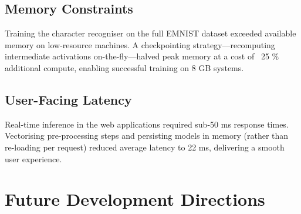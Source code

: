 \documentclass[11pt,a4paper]{report}
\begin{document}
\subsection*{Memory Constraints}

Training the character recogniser on the full EMNIST dataset exceeded available memory on low-resource machines. A checkpointing strategy—recomputing intermediate activations on-the-fly—halved peak memory at a cost of ~25 \% additional compute, enabling successful training on 8 GB systems.

\subsection*{User-Facing Latency}

Real-time inference in the web applications required sub-50 ms response times. Vectorising pre-processing steps and persisting models in memory (rather than re-loading per request) reduced average latency to 22 ms, delivering a smooth user experience.

\section{Future Development Directions}
\end{document}
